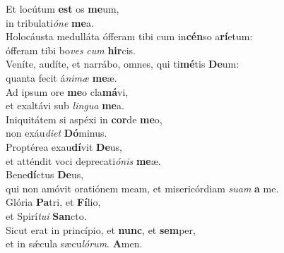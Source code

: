 \oddverse Et locútum \textbf{est} os \textbf{me}um,~\*\\
\oddverse in tribulati\textit{ó}\textit{ne} \textbf{me}a.\\
\evenverse Holocáusta medulláta ófferam tibi cum in\textbf{cén}so a\textbf{rí}etum:~\*\\
\evenverse ófferam tibi bo\textit{ves} \textit{cum} \textbf{hir}cis.\\
\oddverse Veníte, audíte, et narrábo, omnes, qui ti\textbf{mé}tis \textbf{De}um:~\*\\
\oddverse quanta fecit á\textit{ni}\textit{mæ} \textbf{me}æ.\\
\evenverse Ad ipsum ore \textbf{me}o cla\textbf{má}vi,~\*\\
\evenverse et exaltávi sub \textit{lin}\textit{gua} \textbf{me}a.\\
\oddverse Iniquitátem si aspéxi in \textbf{cor}de \textbf{me}o,~\*\\
\oddverse non exáu\textit{di}\textit{et} \textbf{Dó}minus.\\
\evenverse Proptérea exau\textbf{dí}vit \textbf{De}us,~\*\\
\evenverse et atténdit voci deprecati\textit{ó}\textit{nis} \textbf{me}æ.\\
\oddverse Bene\textbf{dí}ctus \textbf{De}us,~\*\\
\oddverse qui non amóvit oratiónem meam, et misericórdiam \textit{su}\textit{am} \textbf{a} me.\\
\evenverse Glória \textbf{Pa}tri, et \textbf{Fí}lio,~\*\\
\evenverse et Spirí\textit{tu}\textit{i} \textbf{San}cto.\\
\oddverse Sicut erat in princípio, et \textbf{nunc}, et \textbf{sem}per,~\*\\
\oddverse et in sǽcula sæcu\textit{ló}\textit{rum}. \textbf{A}men.\\
